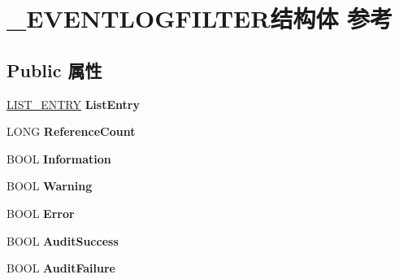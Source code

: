 \hypertarget{struct___e_v_e_n_t_l_o_g_f_i_l_t_e_r}{}\section{\+\_\+\+E\+V\+E\+N\+T\+L\+O\+G\+F\+I\+L\+T\+E\+R结构体 参考}
\label{struct___e_v_e_n_t_l_o_g_f_i_l_t_e_r}
\subsection*{Public 属性}
\begin{DoxyCompactItemize}
\item 
\mbox{\label{struct___e_v_e_n_t_l_o_g_f_i_l_t_e_r_a935f84d91d555f2ec96cb5d11d7ca124}} 
\hyperlink{struct___l_i_s_t___e_n_t_r_y}{L\+I\+S\+T\+\_\+\+E\+N\+T\+RY} {\bfseries List\+Entry}
\item 
\mbox{\label{struct___e_v_e_n_t_l_o_g_f_i_l_t_e_r_ad0cff03e910fe00ee911edb1a3668360}} 
L\+O\+NG {\bfseries Reference\+Count}
\item 
\mbox{\label{struct___e_v_e_n_t_l_o_g_f_i_l_t_e_r_a599d7b18be1587d9bfd46e37516da5da}} 
B\+O\+OL {\bfseries Information}
\item 
\mbox{\label{struct___e_v_e_n_t_l_o_g_f_i_l_t_e_r_a3b67a4400c0352b642390d5dd9be34e4}} 
B\+O\+OL {\bfseries Warning}
\item 
\mbox{\label{struct___e_v_e_n_t_l_o_g_f_i_l_t_e_r_a6828dc5c2e2efffaf94b899b37ca9b5c}} 
B\+O\+OL {\bfseries Error}
\item 
\mbox{\label{struct___e_v_e_n_t_l_o_g_f_i_l_t_e_r_a4e22051fd3edfe3784beed005f80f93e}} 
B\+O\+OL {\bfseries Audit\+Success}
\item 
\mbox{\label{struct___e_v_e_n_t_l_o_g_f_i_l_t_e_r_aaacd7b3c7fefc39101bd4af28e6a55a5}} 
B\+O\+OL {\bfseries Audit\+Failure}
\item 
\mbox{\label{struct___e_v_e_n_t_l_o_g_f_i_l_t_e_r_ad5dda6e43e785d44555708d3ea46f545}} 

\end{DoxyCompactItemize}
